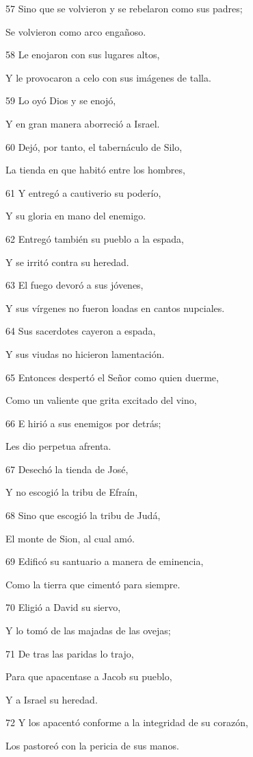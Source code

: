 \par 57 Sino que se volvieron y se rebelaron como sus padres;
\par Se volvieron como arco engañoso.
\par 58 Le enojaron con sus lugares altos,
\par Y le provocaron a celo con sus imágenes de talla.
\par 59 Lo oyó Dios y se enojó,
\par Y en gran manera aborreció a Israel.
\par 60 Dejó, por tanto, el tabernáculo de Silo,
\par La tienda en que habitó entre los hombres,
\par 61 Y entregó a cautiverio su poderío,
\par Y su gloria en mano del enemigo.
\par 62 Entregó también su pueblo a la espada,
\par Y se irritó contra su heredad.
\par 63 El fuego devoró a sus jóvenes,
\par Y sus vírgenes no fueron loadas en cantos nupciales.
\par 64 Sus sacerdotes cayeron a espada,
\par Y sus viudas no hicieron lamentación.
\par 65 Entonces despertó el Señor como quien duerme,
\par Como un valiente que grita excitado del vino,
\par 66 E hirió a sus enemigos por detrás;
\par Les dio perpetua afrenta.
\par 67 Desechó la tienda de José,
\par Y no escogió la tribu de Efraín,
\par 68 Sino que escogió la tribu de Judá,
\par El monte de Sion, al cual amó.
\par 69 Edificó su santuario a manera de eminencia,
\par Como la tierra que cimentó para siempre.
\par 70 Eligió a David su siervo,
\par Y lo tomó de las majadas de las ovejas;
\par 71 De tras las paridas lo trajo,
\par Para que apacentase a Jacob su pueblo,
\par Y a Israel su heredad.
\par 72 Y los apacentó conforme a la integridad de su corazón,
\par Los pastoreó con la pericia de sus manos.

